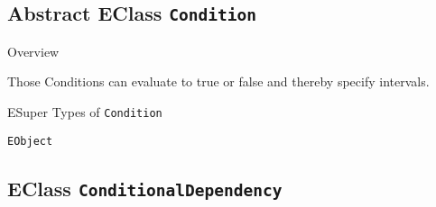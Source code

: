 \subsection{Abstract EClass \bfseries \texttt{Condition}\normalfont}
\label{cls:dependencylanguage::Condition} 
	
	\begin{longdescription}
		\item[Overview] 		
				

	

		Those Conditions can evaluate to true or false and thereby specify intervals.		
		\item[ESuper Types of \texttt{Condition}] ~
			\begin{longdescription}
				\item[\texttt{EObject}] 						\end{longdescription}
		
	
	
	\end{longdescription}
	

\subsection{EClass \bfseries \texttt{ConditionalDependency}\normalfont}
\label{cls:dependencylanguage::ConditionalDependency} 
	
